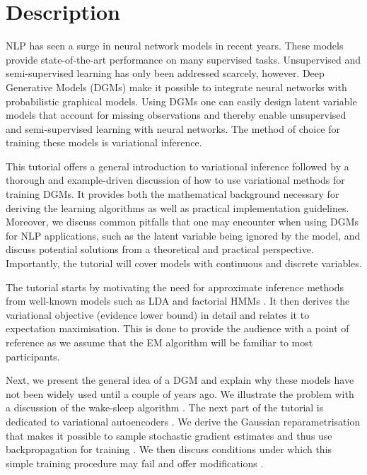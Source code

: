 \section{Description}

NLP has seen a surge in neural network models in recent years. These models provide state-of-the-art
performance on many supervised tasks. Unsupervised and semi-supervised learning has only been
addressed scarcely, however. Deep Generative Models (DGMs) make it possible to integrate neural networks
with probabilistic graphical models. Using DGMs one can easily design latent variable models that
account for missing observations and thereby enable unsupervised and semi-supervised learning
with neural networks. The method of choice for training these models is variational inference.

This tutorial offers a general introduction to variational inference followed by a thorough and 
example-driven discussion of how to use variational methods for training DGMs. It provides both 
the mathematical background necessary for deriving the learning algorithms as well as practical
implementation guidelines. Moreover, we discuss common pitfalls that one may encounter when using
DGMs for NLP applications, such as the latent variable being ignored by the model, and discuss
potential solutions from a theoretical and practical perspective. Importantly, the tutorial
will cover models with continuous and discrete variables.

The tutorial starts by motivating the need for approximate inference methods from well-known models
such as LDA \citep{BleiEtAl:2003} and factorial HMMs \citep{GhahramaniJordan:1996}. It then derives the variational objective (evidence lower bound) in
detail and relates it to expectation maximisation. This is done to provide the audience with
a point of reference as we assume that the EM algorithm will be familiar to most participants.

Next, we present the general idea of a DGM and
explain why these models have not been widely used until a couple of years ago. We illustrate
the problem with a discussion of the wake-sleep algorithm \citep{HintonEtAl:1995}. 
The next part of the tutorial
is dedicated to variational autoencoders \citep{KingmaWelling:2013, RezendeEtAl:2014}. We derive the Gaussian reparametrisation that makes
it possible to sample stochastic gradient estimates and thus use backpropagation for training
\citep{KingmaWelling:2013, RezendeEtAl:2014, TitsiasLazarogredilla:2014}.
We then discuss conditions under which this simple training procedure may fail and offer modifications
\cite[e.g. downscaling the KL-term of the variational objective][]{BowmanEtAl:2016}. 

